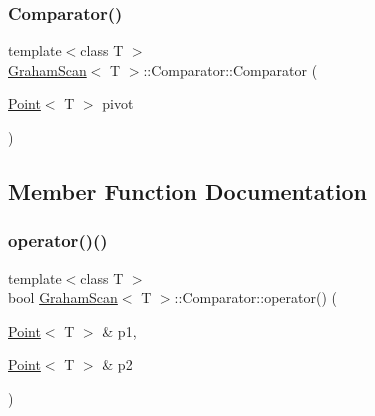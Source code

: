 \subsubsection{\texorpdfstring{Comparator()}{Comparator()}}
{\footnotesize\ttfamily template$<$class T $>$ \\
\mbox{\hyperlink{classGrahamScan}{Graham\+Scan}}$<$ T $>$\+::Comparator\+::\+Comparator (\begin{DoxyParamCaption}\item[{\mbox{\hyperlink{classPoint}{Point}}$<$ T $>$}]{pivot }\end{DoxyParamCaption})\hspace{0.3cm}{\ttfamily [inline]}}


\begin{DoxyCode}{0}

\end{DoxyCode}


\subsection{Member Function Documentation}
\mbox{\label{classGrahamScan_1_1Comparator_a3495ee5d0f1c01f201373b77f71514cb}} 
\subsubsection{\texorpdfstring{operator()()}{operator()()}}
{\footnotesize\ttfamily template$<$class T $>$ \\
bool \mbox{\hyperlink{classGrahamScan}{Graham\+Scan}}$<$ T $>$\+::Comparator\+::operator() (\begin{DoxyParamCaption}\item[{\mbox{\hyperlink{classPoint}{Point}}$<$ T $>$ \&}]{p1,  }\item[{\mbox{\hyperlink{classPoint}{Point}}$<$ T $>$ \&}]{p2 }\end{DoxyParamCaption})\hspace{0.3cm}{\ttfamily [inline]}}


